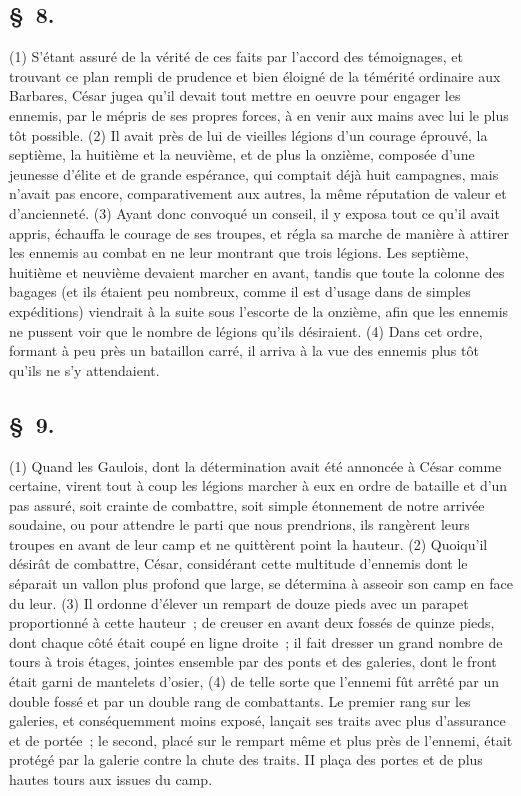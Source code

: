 \documentclass[french,twoside]{book} %
\begin{document}
\subsection[{§ 8.}]{ \textsc{§ 8.} }
\noindent (1) S'étant assuré de la vérité de ces faits par l’accord des témoignages, et trouvant ce plan rempli de prudence et bien éloigné de la témérité ordinaire aux Barbares, César jugea qu’il devait tout mettre en oeuvre pour engager les ennemis, par le mépris de ses propres forces, à en venir aux mains avec lui le plus tôt possible. (2) Il avait près de lui de vieilles légions d’un courage éprouvé, la septième, la huitième et la neuvième, et de plus la onzième, composée d’une jeunesse d’élite et de grande espérance, qui comptait déjà huit campagnes, mais n’avait pas encore, comparativement aux autres, la même réputation de valeur et d’ancienneté. (3) Ayant donc convoqué un conseil, il y exposa tout ce qu’il avait appris, échauffa le courage de ses troupes, et régla sa marche de manière à attirer les ennemis au combat en ne leur montrant que trois légions. Les septième, huitième et neuvième devaient marcher en avant, tandis que toute la colonne des bagages (et ils étaient peu nombreux, comme il est d’usage dans de simples expéditions) viendrait à la suite sous l’escorte de la onzième, afin que les ennemis ne pussent voir que le nombre de légions qu’ils désiraient. (4) Dans cet ordre, formant à peu près un bataillon carré, il arriva à la vue des ennemis plus tôt qu’ils ne s’y attendaient.
\subsection[{§ 9.}]{ \textsc{§ 9.} }
\noindent (1) Quand les Gaulois, dont la détermination avait été annoncée à César comme certaine, virent tout à coup les légions marcher à eux en ordre de bataille et d’un pas assuré, soit crainte de combattre, soit simple étonnement de notre arrivée soudaine, ou pour attendre le parti que nous prendrions, ils rangèrent leurs troupes en avant de leur camp et ne quittèrent point la hauteur. (2) Quoiqu’il désirât de combattre, César, considérant cette multitude d’ennemis dont le séparait un vallon plus profond que large, se détermina à asseoir son camp en face du leur. (3) Il ordonne d’élever un rempart de douze pieds avec un parapet proportionné à cette hauteur ; de creuser en avant deux fossés de quinze pieds, dont chaque côté était coupé en ligne droite ; il fait dresser un grand nombre de tours à trois étages, jointes ensemble par des ponts et des galeries, dont le front était garni de mantelets d’osier, (4) de telle sorte que l’ennemi fût arrêté par un double fossé et par un double rang de combattants. Le premier rang sur les galeries, et conséquemment moins exposé, lançait ses traits avec plus d’assurance et de portée ; le second, placé sur le rempart même et plus près de l’ennemi, était protégé par la galerie contre la chute des traits. II plaça des portes et de plus hautes tours aux issues du camp.
\end{document}
